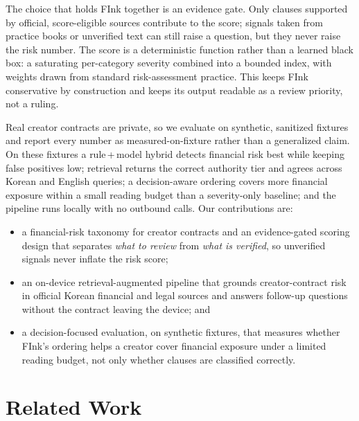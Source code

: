 \documentclass{article}
\theoremstyle{plain}
\begin{document}
The choice that holds FInk together is an evidence gate. Only clauses supported by
official, score-eligible sources contribute to the score; signals taken from
practice books or unverified text can still raise a question, but they never raise
the risk number. The score is a deterministic function rather than a learned
black box: a saturating per-category severity combined into a bounded index, with
weights drawn from standard risk-assessment practice. This keeps FInk conservative
by construction and keeps its output readable as a review priority, not a ruling.

Real creator contracts are private, so we evaluate on synthetic, sanitized
fixtures and report every number as measured-on-fixture rather than a generalized
claim. On these fixtures a rule\,+\,model hybrid detects financial risk best while
keeping false positives low; retrieval returns the correct authority tier and
agrees across Korean and English queries; a decision-aware ordering covers more
financial exposure within a small reading budget than a severity-only baseline;
and the pipeline runs locally with no outbound calls. Our contributions are:

\begin{itemize}
  \item a financial-risk taxonomy for creator contracts and an evidence-gated
        scoring design that separates \emph{what to review} from \emph{what is
        verified}, so unverified signals never inflate the risk score;
  \item an on-device retrieval-augmented pipeline that grounds creator-contract
        risk in official Korean financial and legal sources and answers follow-up
        questions without the contract leaving the device; and
  \item a decision-focused evaluation, on synthetic fixtures, that measures
        whether FInk's ordering helps a creator cover financial exposure under a
        limited reading budget, not only whether clauses are classified correctly.
\end{itemize}

\section{Related Work}
\label{sec:related}
\end{document}
